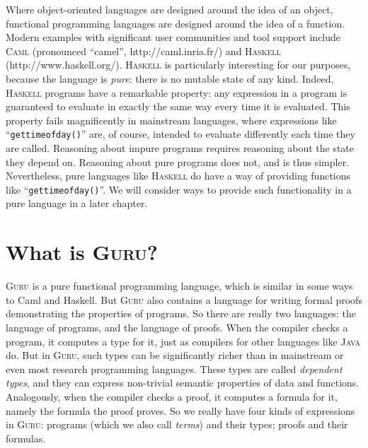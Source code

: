 \documentclass{book}[12pt]
\newcommand{\guru}[0]{\textsc{Guru}\xspace}
\begin{document}
Where object-oriented languages are designed around the idea of an
object, functional programming languages are designed around the idea
of a function.  Modern examples with significant user communities and
tool support include \textsc{Caml} (pronounced ``camel'',
http://caml.inria.fr/) and \textsc{Haskell} (http://www.haskell.org/).
\textsc{Haskell} is particularly interesting for our purposes, because
the language is \emph{pure}: there is no mutable state of any kind.
Indeed, \textsc{Haskell} programs have a remarkable property: any
expression in a program is guaranteed to evaluate in exactly the same
way every time it is evaluated.  This property fails magnificently in
mainstream languages, where expressions like
``\texttt{gettimeofday()}'' are, of course, intended to evaluate
differently each time they are called.  Reasoning about impure
programs requires reasoning about the state they depend on.  Reasoning
about pure programs does not, and is thus simpler.  Nevertheless, pure
languages like \textsc{Haskell} do have a way of providing functions
like ``\texttt{gettimeofday()}''.  We will consider ways to provide
such functionality in a pure language in a later chapter.

\section{What is \guru?}

\guru is a pure functional programming language, which is similar in
some ways to Caml and Haskell.  But \guru also contains a language
for writing formal proofs demonstrating the properties of programs.
So there are really two languages: the language of programs, and the
language of proofs.  When the compiler checks a program, it computes a
type for it, just as compilers for other languages like \textsc{Java}
do.  But in \guru, such types can be significantly richer than in
mainstream or even most research programming languages.  These types
are called \emph{dependent types}, and they can express non-trivial
semantic properties of data and functions.  Analogously, when the
compiler checks a proof, it computes a formula for it, namely the
formula the proof proves.  So we really have four kinds of expressions
in \guru: programs (which we also call \emph{terms}) and their types;
proofs and their formulas.
\end{document}
